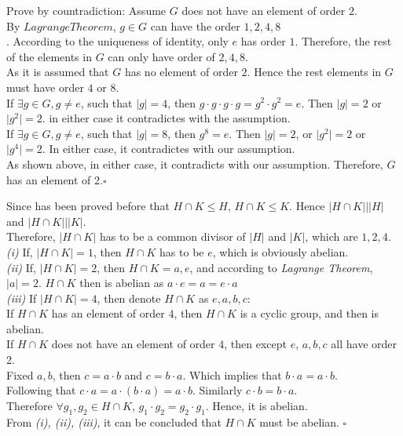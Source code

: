 \documentclass[11pt]{article}
\newcommand{\abs}[1]{\lvert #1 \rvert}
\newenvironment{problem}[2][Problem]{\begin{trivlist}
\item[\hskip \labelsep {\bfseries #1}\hskip \labelsep {\bfseries #2.}]}{\end{trivlist}}
\begin{document}
\begin{problem}{2}
Prove by countradiction: Assume $G$ does not have an element of order $2$.\\
By $Lagrange Theorem$, $g \in G$ can have the order $1,2,4,8$\\. According to the uniqueness of identity, only $e$ has order $1$. Therefore, the rest of the elements in $G$ can only have order of $2,4,8$.\\
As it is assumed that $G$ has no element of order $2$. Hence the rest elements in $G$ must have order $4$ or $8$.\\
If $\exists g \in G, g\neq e$, such that $\abs{g} = 4$, then $ g \cdot g \cdot g \cdot g = g^2 \cdot g^2 = e$. Then $\abs{g} = 2$ or $\abs{g^2} =2$. in either case it contradictes with the assumption.\\
If $\exists g \in G, g \neq e$, such that $\abs{g} = 8$, then $g^8 = e$. Then $\abs{g} = 2$, or $\abs{g^2} = 2$ or $\abs{g^4} = 2$. In either case, it contradictes with our assumption.\\
As shown above, in either case, it contradicts with our assumption. Therefore, $G$ has an element of 2.$\square$\\
\end{problem}
\begin{problem}{3}
Since has been proved before that $H\cap K \leq H$, $H\cap K \leq K$. Hence $\abs{H \cap K}|\abs{H}$ and $\abs{H \cap K} | \abs{K}$.\\
Therefore, $\abs{H\cap K}$ has to be a common divisor of $\abs{H}$ and $\abs{K}$, which are $1,2,4$.\\
\textit{(i)} If, $\abs{H\cap K} = 1$, then $H \cap K$ has to be ${e}$, which is obviously abelian.\\
\textit{(ii)} If, $\abs{H \cap K} = 2$, then $H \cap K = {a ,e}$, and according to \textit{Lagrange Theorem}, $\abs{a} = 2$. $H \cap K$ then is abelian as $a \cdot e = a = e \cdot a$\\
\textit{(iii)} If $\abs{H\cap K} = 4$, then denote $H \cap K$ as ${e, a, b, c}$:\\
If $H\cap K$ has an element of order $4$, then $H \cap K$ is a cyclic group, and then is abelian.\\
If $H \cap K$ does not have an element of order $4$, then except $e$, $a,b,c$ all have order 2.\\
Fixed $a,b$, then $c = a\cdot b$ and $ c = b \cdot a$. Which implies that $b\cdot a = a\cdot b$.\\
Following that $c \cdot a = a \cdot (b \cdot a) = a \cdot b$. Similarly $c \cdot b = b \cdot a$.\\
Therefore $\forall g_1, g_2 \in H \cap K$, $g_1 \cdot g_2 = g_2 \cdot g_1$. Hence, it is abelian.\\
From \textit{(i), (ii), (iii)}, it can be concluded that $H \cap K$ must be abelian. $\square$\\
\end{problem}
\end{document}
